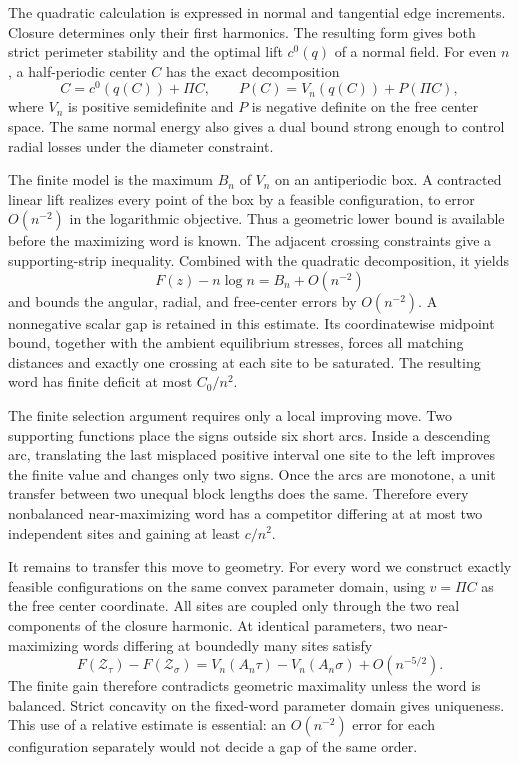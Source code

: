 \documentclass[11pt,reqno]{amsart}
\numberwithin{equation}{section}
\theoremstyle{definition}
\theoremstyle{remark}
\begin{document}
The quadratic calculation is expressed in normal and tangential edge increments. Closure determines only their first harmonics. The resulting form gives both strict perimeter stability and the optimal lift $c^0(q)$ of a normal field. For even $n$, a half-periodic center $C$ has the exact decomposition
\[
 C=c^0(q(C))+\Pi C,
 \qquad P(C)=V_n(q(C))+P(\Pi C),
\]
where $V_n$ is positive semidefinite and $P$ is negative definite on the free center space. The same normal energy also gives a dual bound strong enough to control radial losses under the diameter constraint.

The finite model is the maximum $B_n$ of $V_n$ on an antiperiodic box. A contracted linear lift realizes every point of the box by a feasible configuration, to error $O(n^{-2})$ in the logarithmic objective. Thus a geometric lower bound is available before the maximizing word is known. The adjacent crossing constraints give a supporting-strip inequality. Combined with the quadratic decomposition, it yields
\[
 F(z)-n\log n=B_n+O(n^{-2})
\]
and bounds the angular, radial, and free-center errors by $O(n^{-2})$. A nonnegative scalar gap is retained in this estimate. Its coordinatewise midpoint bound, together with the ambient equilibrium stresses, forces all matching distances and exactly one crossing at each site to be saturated. The resulting word has finite deficit at most $C_0/n^2$.

The finite selection argument requires only a local improving move. Two supporting functions place the signs outside six short arcs. Inside a descending arc, translating the last misplaced positive interval one site to the left improves the finite value and changes only two signs. Once the arcs are monotone, a unit transfer between two unequal block lengths does the same. Therefore every nonbalanced near-maximizing word has a competitor differing at at most two independent sites and gaining at least $c/n^2$.

It remains to transfer this move to geometry. For every word we construct exactly feasible configurations on the same convex parameter domain, using $v=\Pi C$ as the free center coordinate. All sites are coupled only through the two real components of the closure harmonic. At identical parameters, two near-maximizing words differing at boundedly many sites satisfy
\[
 F(\mathcal Z_\tau)-F(\mathcal Z_\sigma)
 =V_n(A_n\tau)-V_n(A_n\sigma)+O(n^{-5/2}).
\]
The finite gain therefore contradicts geometric maximality unless the word is balanced. Strict concavity on the fixed-word parameter domain gives uniqueness. This use of a relative estimate is essential: an $O(n^{-2})$ error for each configuration separately would not decide a gap of the same order.
\end{document}
